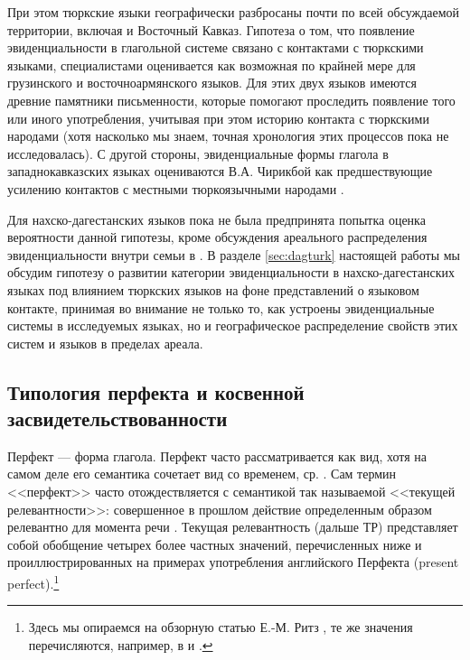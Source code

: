 При этом тюркские языки географически разбросаны почти по всей обсуждаемой территории, включая и Восточный Кавказ. Гипотеза о том, что появление эвиденциальности в глагольной системе связано с контактами с тюркскими языками, специалистами оценивается как возможная по крайней мере для грузинского \citep[297--298]{boeder2000} и восточноармянского \citep[415]{kozintseva2000} языков. Для этих двух языков имеются древние памятники письменности, которые помогают проследить появление того или иного употребления, учитывая при этом историю контакта с тюркскими народами (хотя насколько мы знаем, точная хронология этих процессов пока не исследовалась). С другой стороны, эвиденциальные формы глагола в западнокавказских языках оцениваются В.А. Чирикбой как предшествующие усилению контактов с местными тюркоязычными народами \citep[265--267]{chirikba2003}.
\par Для нахско-дагестанских языков пока не была предпринята попытка оценка вероятности данной гипотезы, кроме обсуждения ареального распределения эвиденциальности внутри семьи в \citep{verhees2018pstgu}. В разделе \ref{sec:dagturk} настоящей работы мы обсудим гипотезу о развитии категории эвиденциальности в нахско-дагестанских языках под влиянием тюркских языков на фоне представлений о языковом контакте, принимая во внимание не только то, как устроены эвиденциальные системы в исследуемых языках, но и географическое распределение свойств этих систем и языков в пределах ареала.

\subsection{Типология перфекта и косвенной засвидетельствованности} \label{sec:pftyp}

\color{black}
Перфект --- форма глагола. Перфект часто рассматривается как вид, хотя на самом деле его семантика сочетает вид со временем, ср. \citep[6]{comrie1976}. Сам термин <<перфект>> часто отождествляется с семантикой так называемой <<текущей релевантности>>: совершенное в прошлом действие определенным образом релевантно для момента речи \citep[24--25]{comrie1985}. Текущая релевантность (дальше ТР) представляет собой обобщение четырех более частных значений, перечисленных ниже и проиллюстрированных на примерах употребления английского Перфекта (present perfect).\footnote{\color{purple} Здесь мы опираемся на обзорную статью Е.-М. Ритз \citep[882--884]{ritz2012}, те же значения перечисляются, например, в \citep{comrie1976} и \citep{mccawley1971}.}

